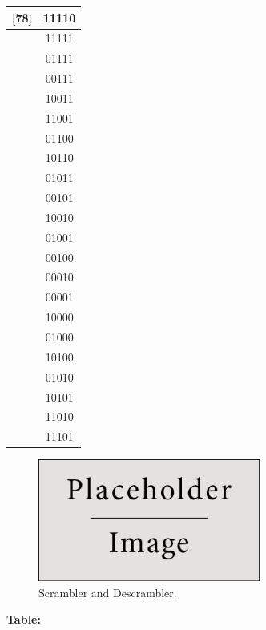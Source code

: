 \documentclass{article}
\begin{document}
\begin{tabular}{c|c}
  [78]	& 11110 \\ \hline
  [79]	& 11111 \\ \hline
  [80]	& 01111 \\ \hline
  [81]	& 00111 \\ \hline
  [82]	& 10011 \\ \hline
  [83]	& 11001 \\ \hline
  [84]	& 01100 \\ \hline
  [85]	& 10110 \\ \hline
  [86]	& 01011 \\ \hline
  [87]	& 00101 \\ \hline
  [88]	& 10010 \\ \hline
  [89]	& 01001 \\ \hline
  [90]	& 00100 \\ \hline
  [91]	& 00010 \\ \hline
  [92]	& 00001 \\ \hline
  [93]	& 10000 \\ \hline
  [94]	& 01000 \\ \hline
  [95]	& 10100 \\ \hline
  [96]	& 01010 \\ \hline
  [97]	& 10101 \\ \hline
  [98]	& 11010 \\ \hline
  [99]	& 11101 \\ \hline
\end{tabular}

\begin{figure}[h]
  \begin{center}
    \includegraphics[width=0.65\textwidth]{img/placeholder.jpg}
    \caption{Scrambler and Descrambler.}
  \end{center}
\end{figure}

\textbf{Table:}
\end{document}
